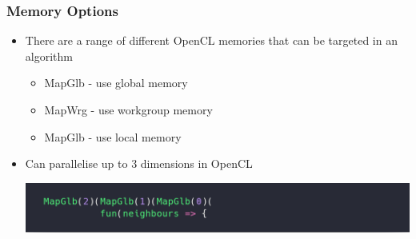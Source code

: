\documentclass[10pt]{beamer}
\begin{document}
\begin{frame}
\frametitle{Memory Options}
\begin{itemize}
    \item There are a range of different OpenCL memories that can be targeted in an algorithm 
        \begin{itemize}
            \item MapGlb - use global memory
            \item MapWrg - use workgroup memory
            \item MapGlb - use local memory
        \end{itemize}
    \item Can parallelise up to 3 dimensions in OpenCL  
    \begin{block}{}
        \begin{center}
            \includegraphics[width=.85\textwidth]{../images/mapMapMap.png}
        \end{center}
    \end{block}
\end{itemize}

\end{frame}
\end{document}

